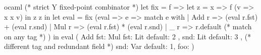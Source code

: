 \begin{cminted}{ocaml}
(* strict Y fixed-point combinator *) 
let fix = f => let z = x => f (v => x x v) in z z in
let eval = fix (eval => e =>
  match e with 
  | Add r => (eval r.fst) + (eval r.snd)
  | Mul r => (eval r.fst) * (eval r.snd)
  | _ r => r.default (* match on any tag *)
) in eval (
  Add { 
    fst: Mul { 
      fst: Lit { default: 2 },
      snd: Lit { default: 3 } 
    }, 
    (* different tag and redundant field *) 
    snd: Var { default: 1, foo: {} }
  }
)
\end{cminted}